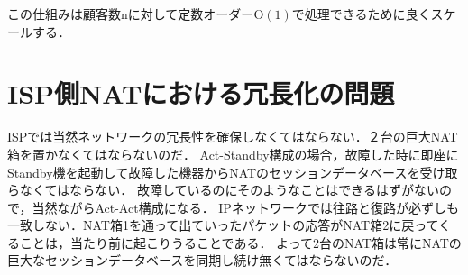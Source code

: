 この仕組みは顧客数nに対して定数オーダー$\mathrm{O}(1)$で処理できるために良くスケールする．

\section{ISP側NATにおける冗長化の問題}

ISPでは当然ネットワークの冗長性を確保しなくてはならない．２台の巨大NAT箱を置かなくてはならないのだ．
Act-Standby構成の場合，故障した時に即座にStandby機を起動して故障した機器からNATのセッションデータベースを受け取らなくてはならない．
故障しているのにそのようなことはできるはずがないので，当然ながらAct-Act構成になる．
IPネットワークでは往路と復路が必ずしも一致しない．NAT箱1を通って出ていったパケットの応答がNAT箱2に戻ってくることは，当たり前に起こりうることである．
よって2台のNAT箱は常にNATの巨大なセッションデータベースを同期し続け無くてはならないのだ．


